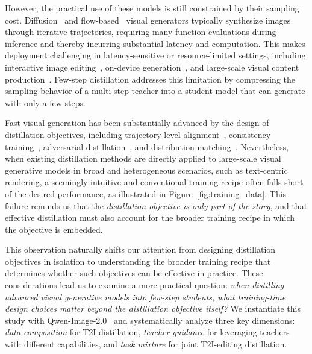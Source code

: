 \documentclass{llmxive}
\begin{document}
However, the practical use of these models is still constrained by their sampling cost. Diffusion~\citep{ho2020denoising, song2020score} and flow-based~\citep{lipman2022flow} visual generators typically synthesize images through iterative trajectories, requiring many function evaluations during inference and thereby incurring substantial latency and computation. This makes deployment challenging in latency-sensitive or resource-limited settings, including interactive image editing~\citep{meng2022sdedit, Brooks2022InstructPix2PixLT}, on-device generation~\citep{li2023snapfusion,zhao2024mobilediffusion}, and large-scale visual content production~\citep{azuma1997survey, yin2025causvid}. Few-step distillation addresses this limitation by compressing the sampling behavior of a multi-step teacher into a student model that can generate with only a few steps.


Fast visual generation has been substantially advanced by the design of distillation objectives, including trajectory-level alignment~\citep{geng2025mean}, consistency training~\citep{song2023consistency}, adversarial distillation~\citep{sauer2024adversarial}, and distribution matching~\citep{yin2024one, yin2024improved, jiang2025distribution}. Nevertheless, when existing distillation methods are directly applied to large-scale visual generative models in broad and heterogeneous scenarios, such as text-centric rendering, a seemingly intuitive and conventional training recipe often falls short of the desired performance, as illustrated in Figure~\ref{fig:training_data}. This failure reminds us that the \textit{distillation objective is only part of the story}, and that effective distillation must also account for the broader training recipe in which the objective is embedded.


This observation naturally shifts our attention from designing distillation objectives in isolation to understanding the broader training recipe that determines whether such objectives can be effective in practice. These considerations lead us to examine a more practical question: \textit{when distilling advanced visual generative models into few-step students, what training-time design choices matter beyond the distillation objective itself?} We instantiate this study with Qwen-Image-2.0~\citep{zhao2026qwen} and systematically analyze three key dimensions: \textit{data composition} for T2I distillation, \textit{teacher guidance} for leveraging teachers with different capabilities, and \textit{task mixture} for joint T2I-editing distillation.
\end{document}
